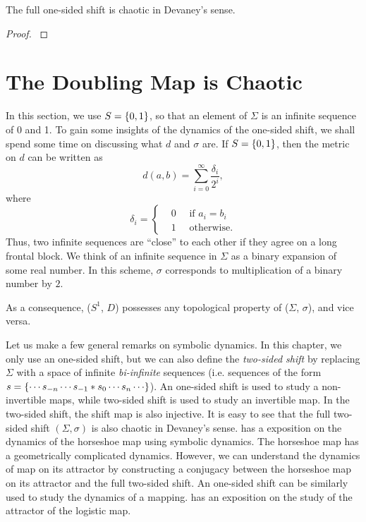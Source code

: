 \documentclass[10pt,twoside]{book}
\begin{document}
\begin{theorem}
  The full one-sided shift is chaotic in Devaney's sense.
  \begin{proof}
    \citep{sternberg}
  \end{proof}
\end{theorem}


\section{The Doubling Map is Chaotic}
In this section, we use $S = \left \{ 0,1 \right \}$, so that an element of $\Sigma$ is an infinite sequence of 0 and 1.
To gain some insights of the dynamics of the one-sided shift, we shall spend some time on discussing what $d$ and $\sigma$ are.
If $S = \left \{ 0,1 \right \}$, then the metric on $d$ can be written as
\begin{equation*}
  d(a,b) = \sum\limits_{i = 0}^{\infty} \frac{\delta_{i}}{2^i},
\end{equation*}
where
\begin{equation*}
  \delta_i = 
  \begin{cases}
    &0 \quad \mbox{ if } a_i = b_i  \\
    &1 \quad \mbox{ otherwise.}
  \end{cases}
\end{equation*}
Thus, two infinite sequences are ``close'' to each other if they agree on a long frontal block.
We think of an infinite sequence in $\Sigma$ as a binary expansion of some real number.
In this scheme, $\sigma$ corresponds to multiplication of a binary number by $2$.

As a consequence, ($S^1$, $D$) possesses any topological property of ($\Sigma$, $\sigma$), and vice versa.

Let us make a few general remarks on symbolic dynamics.
In this chapter, we only use an one-sided shift, but we can also define the \textit{two-sided shift} by replacing $\Sigma$ with a space of infinite \textit{bi-infinite} sequences (i.e. sequences of the form $s = \set{ \cdots s_{-n} \cdots s_{-1} * s_0 \cdots s_n \cdots }$).
An one-sided shift is used to study a non-invertible maps, while two-sided shift is used to study an invertible map.
In the two-sided shift, the shift map is also injective.
It is easy to see that the full two-sided shift $(\Sigma, \sigma)$ is also chaotic in Devaney's sense.
\citet{wiggins} has a exposition on the dynamics of the horseshoe map using symbolic dynamics.
The horseshoe map has a geometrically complicated dynamics.
However, we can understand the dynamics of map on its attractor by constructing a conjugacy between the horseshoe map on its attractor and the full two-sided shift.
An one-sided shift can be similarly used to study the dynamics of a mapping.
\citet{sternberg} has an exposition on the study of the attractor of the logistic map.
\end{document}
